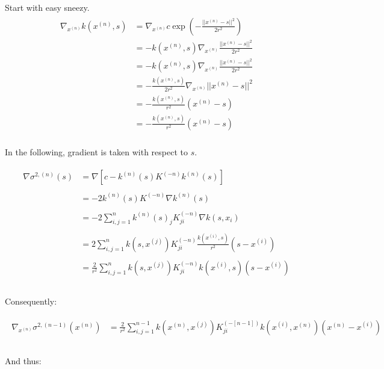\documentclass[paper=a4, fontsize=11pt]{scrartcl} %
\numberwithin{equation}{section} %
\numberwithin{figure}{section} %
\numberwithin{table}{section} %
\newcommand{\gxn}{\nabla_{x^{(n)}}} %
\newcommand{\xn}{x^{(n)}}
\newcommand{\xii}{x^{(i)}}
\newcommand{\xj}{x^{(j)}}
\newcommand{\kn}{k^{(n)}}
\newcommand{\Kinvn}{K^{(-n)}} %
\newcommand{\Kinvnm}{K^{(-[n-1])}}
\newcommand{\sqn}{\sigma ^{2 , (n)}     }
\newcommand{\signxn}{\sigma^{2, (n-1)} (\xn)}
\begin{document}
Start with easy sneezy.
\begin{align}
 \begin{split}
  \gxn k(\xn,s) &= \gxn c\exp(-\frac{||\xn - s||^2}{2r^2} )\\
%
&= -k(\xn,s) \gxn\frac{||\xn - s||^2}{2r^2} \\
%
&= -k(\xn,s) \gxn\frac{||\xn - s||^2}{2r^2} \\
%
&= -\frac{k(\xn,s)}{2r^2} \gxn||\xn - s||^2 \\
%
&= -\frac{k(\xn,s)}{r^2} (\xn-s)\\
%
&= -\frac{k(\xn ,s)}{r^2} (\xn-s)\\
 \end{split}
\end{align}

In the following, gradient is taken with respect to $s$.

\begin{align}
 \begin{split}
  \nabla \sqn (s) &= \nabla [ c - \kn(s) \Kinvn \kn(s)]\\\\
%
%
%
&= -2 \kn(s) \Kinvn \nabla\kn(s)\\\\
%
%
%
&= -2 \sum_{i,j=1}^{n} \kn(s)_j \Kinvn_{ji} \nabla k (s, x_i)\\\\
%
%
%
&= 2 \sum_{i,j=1}^{n} k(s,\xj) \Kinvn_{ji} \frac{k(\xii ,s)}{r^2} (s-\xii)\\\\
%
%
%
&= \frac{2}{r^2} \sum_{i,j=1}^{n} k(s,\xj) \Kinvn_{ji} k(\xii ,s) (s-\xii)\\\\
 \end{split}
\end{align}

Consequently:

\begin{align}
 \begin{split}
  \gxn \signxn &= \frac{2}{r^2} \sum_{i,j=1}^{n-1} k(\xn,\xj) \Kinvnm_{ji} k(\xii ,\xn) (\xn-\xii)\\\\
 \end{split}
\end{align}

And thus:
\end{document}
